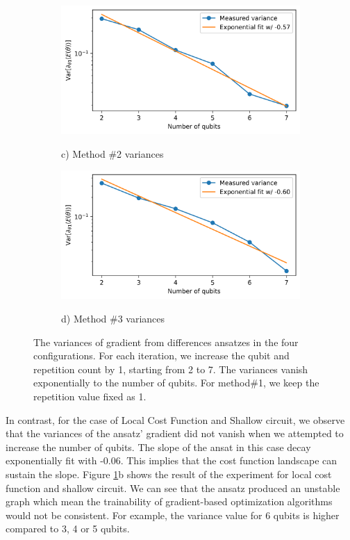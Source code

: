 \begin{figure}
    \begin{subfigure}[b]{.49\textwidth}
        \includegraphics[width=\textwidth]{Artefact/Appendices/var2.png}
        \centerline{c) Method \#2 variances}
    \end{subfigure}
    \hfill
    \begin{subfigure}[b]{.49\textwidth}
        \includegraphics[width=\textwidth]{Artefact/Appendices/var3.png}
        \centerline{d) Method \#3 variances}
    \end{subfigure}

    \caption{
        The variances of gradient from differences ansatzes in the four configurations.
        For each iteration, we increase the qubit and repetition count by 1, starting from 2 to 7.
        The variances vanish exponentially to the number of qubits.
        For method\#1, we keep the repetition value fixed as 1.
    }
    \label{Plot ansatzes variance}
\end{figure}

In contrast, for the case of Local Cost Function and Shallow circuit, we observe that the variances of the ansatz' gradient did not vanish when we attempted to increase the number of qubits.
The slope of the ansat in this case decay exponentially fit with -0.06.
This implies that the cost function landscape can sustain the slope.
Figure \ref{Plot ansatzes variance}b shows the result of the experiment for local cost function and shallow circuit.
We can see that the ansatz produced an unstable graph which mean the trainability of gradient-based optimization algorithms would not be consistent.
For example, the variance value for 6 qubits is higher compared to 3, 4 or 5 qubits.

